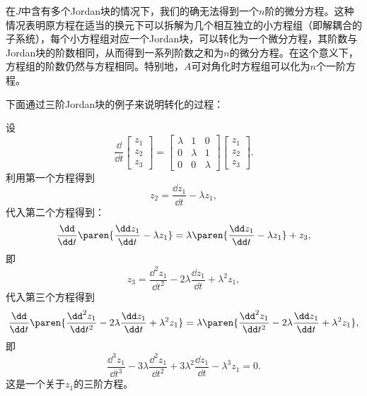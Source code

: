 在$J$中含有多个Jordan块的情况下，我们的确无法得到一个$n$阶的微分方程。这种情况表明原方程在适当的换元下可以拆解为几个相互独立的小方程组（即解耦合的子系统），每个小方程组对应一个Jordan块，可以转化为一个微分方程，其阶数与Jordan块的阶数相同，从而得到一系列阶数之和为$n$的微分方程。在这个意义下，方程组的阶数仍然与方程相同。特别地，$A$可对角化时方程组可以化为$n$个一阶方程。

下面通过三阶Jordan块的例子来说明转化的过程：

\begin{example}
    设
    \begin{equation}
        \frac{\dd}{\dd t}\begin{bmatrix}
            z_1\\
            z_2\\
            z_3
        \end{bmatrix}=\begin{bmatrix}
        \lambda & 1 & 0\\
        0 & \lambda & 1\\
        0 & 0 & \lambda
        \end{bmatrix}\begin{bmatrix}
            z_1\\
            z_2\\
            z_3
        \end{bmatrix}.
    \end{equation}
    利用第一个方程得到
    \begin{equation}
        z_2=\frac{\dd z_1}{\dd t}-\lambda z_1,
    \end{equation}
    代入第二个方程得到：
    \begin{equation}
        \frac{\dd}{\dd t}\paren{\frac{\dd z_1}{\dd t}-\lambda z_1}=\lambda\paren{\frac{\dd z_1}{\dd t}-\lambda z_1}+z_3,
    \end{equation}
    即
    \begin{equation}
        z_3=\frac{\dd^2 z_1}{\dd t^2}-2\lambda\frac{\dd z_1}{\dd t}+\lambda^2 z_1,
    \end{equation}
    代入第三个方程得到
    \begin{equation}
        \frac{\dd}{\dd t}\paren{\frac{\dd^2 z_1}{\dd t^2}-2\lambda\frac{\dd z_1}{\dd t}+\lambda^2 z_1}=\lambda\paren{\frac{\dd^2 z_1}{\dd t^2}-2\lambda\frac{\dd z_1}{\dd t}+\lambda^2 z_1},
    \end{equation}
    即
    \begin{equation}
        \frac{\dd^3 z_1}{\dd t^3}-3\lambda\frac{\dd^2 z_1}{\dd t^2}+3\lambda^2\frac{\dd z_1}{\dd t}-\lambda^3 z_1=0.
    \end{equation}
    这是一个关于$z_1$的三阶方程。
\end{example}

